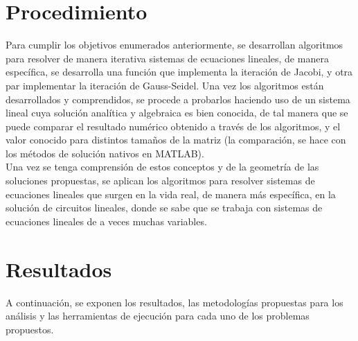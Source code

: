 \documentclass[11pt, spanish]{article}
\begin{document}
\section{Procedimiento}

Para cumplir los objetivos enumerados anteriormente, se desarrollan algoritmos para resolver de manera iterativa sistemas de ecuaciones lineales, de manera específica, se desarrolla una función que implementa la iteración de Jacobi, y otra par implementar la iteración de Gauss-Seidel. Una vez los algoritmos están desarrollados y comprendidos, se procede a probarlos haciendo uso de un sistema lineal cuya solución analítica y algebraica es bien conocida, de tal manera que se puede comparar el resultado numérico obtenido a través de los algoritmos, y el valor conocido para distintos tamaños de la matriz (la comparación, se hace con los métodos de solución nativos en \textsc{MATLAB}). \\

Una vez se tenga comprensión de estos conceptos y de la geometría de las soluciones propuestas, se aplican los algoritmos para resolver sistemas de ecuaciones lineales que surgen en la vida real, de manera más específica, en la solución de circuitos lineales, donde se sabe que se trabaja con sistemas de ecuaciones lineales de a veces muchas variables.

\section{Resultados}

A continuación, se exponen los resultados, las metodologías propuestas para los análisis y las herramientas de ejecución para cada uno de los problemas propuestos.\\
\end{document}
